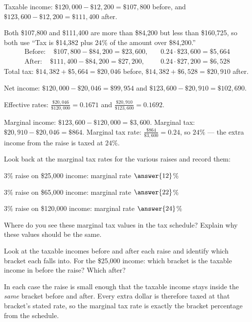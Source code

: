 \documentclass[12pt]{ximera}
\begin{document}
\begin{problem}
\begin{solution}
Taxable income: $\$120{,}000 - \$12{,}200 = \$107{,}800$ before, and
$\$123{,}600 - \$12{,}200 = \$111{,}400$ after.

Both \$107,800 and \$111,400 are more than \$84,200 but less than \$160,725, so both
use ``Tax is \$14,382 plus $24\%$ of the amount over \$84,200.''
\[
\begin{aligned}
\text{Before}: \quad \$107{,}800 - \$84{,}200 = \$23{,}600, &\quad 0.24 \cdot \$23{,}600 = \$5{,}664 \\
\text{After}: \quad \$111{,}400 - \$84{,}200 = \$27{,}200, &\quad 0.24 \cdot \$27{,}200 = \$6{,}528
\end{aligned}
\]
Total tax: $\$14{,}382 + \$5{,}664 = \$20{,}046$ before,
$\$14{,}382 + \$6{,}528 = \$20{,}910$ after.

Net income: $\$120{,}000 - \$20{,}046 = \$99{,}954$ and
$\$123{,}600 - \$20{,}910 = \$102{,}690$.

Effective rates: $\frac{\$20{,}046}{\$120{,}000} = 0.1671$ and
$\frac{\$20{,}910}{\$123{,}600} = 0.1692$.

Marginal income: $\$123{,}600 - \$120{,}000 = \$3{,}600$.
Marginal tax: $\$20{,}910 - \$20{,}046 = \$864$.
Marginal tax rate: $\frac{\$864}{\$3{,}600} = 0.24$, so $24\%$ --- the extra income
from the raise is taxed at $24\%$.
\end{solution}
\end{problem}

\begin{problem}
Look back at the marginal tax rates for the various raises and record them:

$3\%$ raise on \$25,000 income: marginal rate $\answer{12}$\%

$3\%$ raise on \$65,000 income: marginal rate $\answer{22}$\%

$3\%$ raise on \$120,000 income: marginal rate $\answer{24}$\%

Where do you see these marginal tax values in the tax schedule? Explain why these
values should be the same.

\begin{hint}
Look at the taxable incomes before and after each raise and identify which bracket
each falls into. For the \$25,000 income: which bracket is the taxable income in
before the raise? Which after?
\end{hint}

\begin{freeResponse}
\end{freeResponse}

\begin{solution}
In each case the raise is small enough that the taxable income stays inside the
\emph{same} bracket before and after. Every extra dollar is therefore taxed at that
bracket's stated rate, so the marginal tax rate is exactly the bracket percentage
from the schedule.
\end{solution}
\end{problem}
\end{document}
